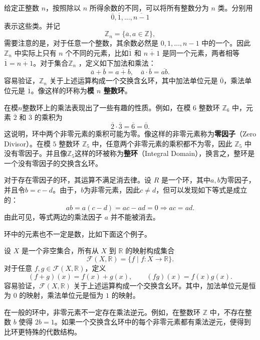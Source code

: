 \begin{example}
    \label{ex_modular_ring}
    给定正整数 \(n\)，按照除以 \(n\) 所得余数的不同，可以将所有整数分为 \(n\) 类。分别用
    \[
        \overline 0,\overline 1,\ldots,\overline{n-1}
    \]
    表示这些类。并记
    \[
        \mathbb Z_n=\{\overline{a}, a \in \mathbb Z\},
    \]
    需要注意的是，对于任意一个整数，其余数必然是 \(0,1,\ldots,n-1\) 中的一个。因此 \(\mathbb Z_n\) 中实际上只有 \(n\) 个不同的元素，比如\( \overline 1 \) 和 \( \overline{n+1} \) 是同一个元素，两者相等\( \overline 1 = \overline{n+1} \)。对于集合\(\mathbb{Z}_n\) ，定义如下加法和乘法：
    \[
        \overline a+\overline b=\overline{a+b},\quad \overline a\cdot\overline b=\overline{ab}.
    \]
    容易验证，\(\mathbb Z_n\) 关于上述运算构成一个交换含幺环，其中加法单位元是 \(\overline 0\)，乘法单位元是 \(\overline 1\)。像这样的环称为\textbf{模 \(n\) 整数环}。
\end{example}

在模\( n \)整数环上的乘法表现出了一些有趣的性质。例如，在模 \(6\) 整数环 \(\mathbb Z_6\) 中，元素 \(\overline 2\) 和 \(\overline 3\) 的乘积为
\[
    \overline 2\cdot \overline 3=\overline{6}=\overline 0.
\]
这说明，环中两个非零元素的乘积可能为零。像这样的非零元素称为\textbf{零因子}（Zero Divisor）。在模 \(5\) 整数环 \(\mathbb Z_5\) 中，任意两个非零元素的乘积都不为零，因此 \(\mathbb Z_5\) 中没有零因子。并且像\(\mathbb Z_5\)这样的环被称为\textbf{整环}（Integral Domain），换言之，整环是一个没有零因子的交换含幺环。

对于存在零因子的环，其运算不满足消去律。设 \(R\) 是一个环，其中\( a, b \)为零因子，并且令\( b = c - d  \)。由于，\( b \)为非零元素，因此\( c \neq d \)，但可以发现如下等式是成立的：
\[
    ab = a(c - d) = ac - ad = 0  \Rightarrow ac = ad.
\]
由此可见，等式两边的乘法因子 \(a\) 并不能被消去。


环中的元素也不一定是数，比如下面这个例子。
\begin{example}
    \label{ex_function_ring}
    设 \(X\) 是一个非空集合，所有从 \(X\) 到 \(\mathbb R\) 的映射构成集合
    \[
        \mathcal F(X,\mathbb R)=\{f\mid f:X\rightarrow\mathbb R\}.
    \]
    对于任意 \(f,g\in\mathcal F(X,\mathbb R)\)，定义
    \[
        (f+g)(x)=f(x)+g(x),\qquad
        (fg)(x)=f(x)g(x).
    \]
    容易验证，\(\mathcal F(X,\mathbb R)\) 关于上述运算构成一个交换含幺环。其中，加法单位元是恒为 \(0\) 的映射，乘法单位元是恒为 \(1\) 的映射。
\end{example}

在一般的环中，非零元素不一定存在乘法逆元。例如，在整数环 \(\mathbb Z\) 中，不存在整数 \(b\) 使得 \(2b=1\)。如果一个交换含幺环中的每个非零元素都有乘法逆元，便得到比环更特殊的代数结构。

